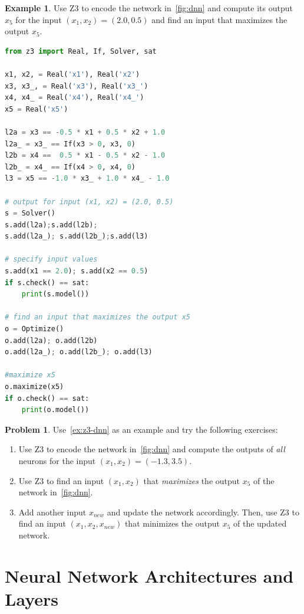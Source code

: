 \documentclass[oneside,11pt,dvipsnames]{book}
\numberwithin{equation}{section}
\theoremstyle{definition}
\newtheorem{example}{Example}[section]
\newtheorem{problem}{Problem}[section]
\theoremstyle{remark}
\begin{document}
\begin{example}\label{ex:z3-dnn}
Use Z3 to encode the network in~\autoref{fig:dnn} and compute its output $x_5$ for the input $(x_1, x_2) = (2.0, 0.5)$ and find an input that maximizes the output $x_5$.

\begin{lstlisting}[language=python,multicols=2]
from z3 import Real, If, Solver, sat

x1, x2, = Real('x1'), Real('x2') 
x3, x3_, = Real('x3'), Real('x3_')
x4, x4_ = Real('x4'), Real('x4_')
x5 = Real('x5')

l2a = x3 == -0.5 * x1 + 0.5 * x2 + 1.0
l2a_ = x3_ == If(x3 > 0, x3, 0)
l2b = x4 ==  0.5 * x1 - 0.5 * x2 - 1.0
l2b_ = x4_ == If(x4 > 0, x4, 0)
l3 = x5 == -1.0 * x3_ + 1.0 * x4_ - 1.0

# output for input (x1, x2) = (2.0, 0.5)
s = Solver()
s.add(l2a);s.add(l2b);
s.add(l2a_); s.add(l2b_);s.add(l3)

# specify input values
s.add(x1 == 2.0); s.add(x2 == 0.5)
if s.check() == sat:
    print(s.model())

# find an input that maximizes the output x5
o = Optimize()
o.add(l2a); o.add(l2b)
o.add(l2a_); o.add(l2b_); o.add(l3)

#maximize x5
o.maximize(x5)
if o.check() == sat:
    print(o.model())
\end{lstlisting} 
\end{example}

\begin{problem}\label{prob:z3-dnn}
    Use~\autoref{ex:z3-dnn} as an example and try the following exercises:
    \begin{enumerate}
    \item Use Z3 to encode the network in~\autoref{fig:dnn} and compute the outputs of \emph{all} neurons for the input $(x_1, x_2) = (-1.3, 3.5)$.
    \item Use Z3 to find an input $(x_1, x_2)$ that \emph{maximizes} the output $x_5$ of the network in~\autoref{fig:dnn}.
    \item Add another input $x_{new}$ and update the network accordingly. Then, use Z3 to find an input $(x_1, x_2, x_{new})$ that {minimizes} the output $x_5$ of the updated network.
    \end{enumerate}
\end{problem}
\section{Neural Network Architectures and Layers}
\end{document}
